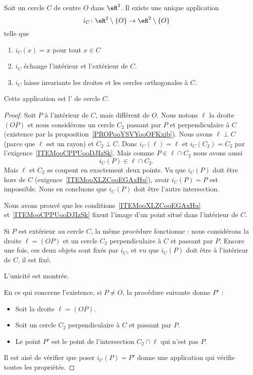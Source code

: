 \begin{propositionDef}       \label{PROPDEFooVLIWooQgpLQa}
	Soit un cercle \( C\) de centre \( O\) dans \( \eR^2\). Il existe une unique application
	\begin{equation}
		i_C\colon \eR^2\setminus \{ O \}\to \eR^2\setminus \{ O \}
	\end{equation}
	telle que
	\begin{enumerate}
		\item
		      \( i_C(x)=x\) pour tout \( x\in C\)
		      \item\label{ITEMooXLZCooEGAxHu}
		      \( i_C\) échange l'intérieur et l'extérieur de \( C\).
		      \item\label{ITEMooCPPUooDJIzSk}
		      \( i_C\) laisse invariants les droites et les cercles orthogonales à \( C\).
	\end{enumerate}
	Cette application est l' de cercle \( C\).
\end{propositionDef}

\begin{proof}
	Soit \( P\) à l'intérieur de \( C\), mais différent de \( O\). Nous notons \( \ell\) la droite \( (OP)\) et nous considérons un cercle \( C_2\) passant par \( P\) et perpendiculaire à \( C\) (existence par la proposition~\ref{PROPooYSVYooOFKxib}). Nous avons \( \ell\perp C\) (parce que \( \ell\) est un rayon) et \( C_2\perp C\). Donc \( i_C(\ell)=\ell\) et \( i_C(C_2)=C_2\) par l'exigence~\ref{ITEMooCPPUooDJIzSk}. Mais comme \( P\in\ell\cap C_2 \) nous avons aussi
	\begin{equation}
		i_C(P)\in \ell\cap C_2.
	\end{equation}
	Mais \( \ell\) et \( C_2\) se coupent en exactement deux points. Vu que \( i_C(P)\) doit être hors de \( C\) (exigence~\ref{ITEMooXLZCooEGAxHu}), avoir \( i_C(P)=P\) est impossible. Nous en concluons que \( i_C(P)\) doit être l'autre intersection.

	Nous avons prouvé que les conditions~\ref{ITEMooXLZCooEGAxHu} et~\ref{ITEMooCPPUooDJIzSk} fixent l'image d'un point situé dans l'intérieur de \( C\).

	Si \( P\) est extérieur au cercle \( C\), la même procédure fonctionne : nous considérons la droite \( \ell=(OP)\) et un cercle \( C_2\) perpendiculaire à \( C\) et passant par \( P\). Encore une fois, ces deux objets sont fixés par \( i_C\), et vu que \( i_C(P)\) doit être à l'intérieur de \( C\), il est fixé.

	L'unicité est montrée.

	En ce qui concerne l'existence, si \( P\neq O\), la procédure suivante donne \( P'\) :
	\begin{itemize}
		\item Soit la droite \( \ell=(OP)\).
		\item Soit un cercle \( C_2\) perpendiculaire à \( C\) et passant par \( P\).
		\item Le point \( P'\) est le point de l'intersection \( C_2\cap\ell\) qui n'est pas \( P\).
	\end{itemize}
	Il est aisé de vérifier que poser \( i_C(P)=P'\) donne une application qui vérifie toutes les propriétés.
\end{proof}


